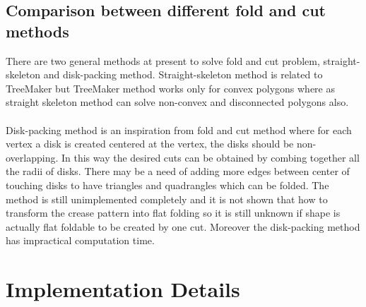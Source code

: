 \documentclass[11pt]{article}
\begin{document}
\subsection{Comparison between different fold and cut methods}
There are two general methods at present to solve fold and cut problem, straight-skeleton and disk-packing method. Straight-skeleton method is related to TreeMaker but TreeMaker method works only for convex polygons where as straight skeleton method can solve non-convex and disconnected polygons also.\\\\
Disk-packing method is an inspiration from fold and cut method where for each vertex a disk is created centered at the vertex, the disks should be non-overlapping. In this way the desired cuts can be obtained by combing together all the radii of disks. There may be a need of adding more edges between center of touching disks  to have triangles and quadrangles which can be folded. The method is still unimplemented completely and it is not shown that how to transform the crease pattern into flat folding so it is still unknown if shape is actually flat foldable to be created by one cut. Moreover the disk-packing method has impractical computation time.


\section{Implementation Details}
\end{document}
